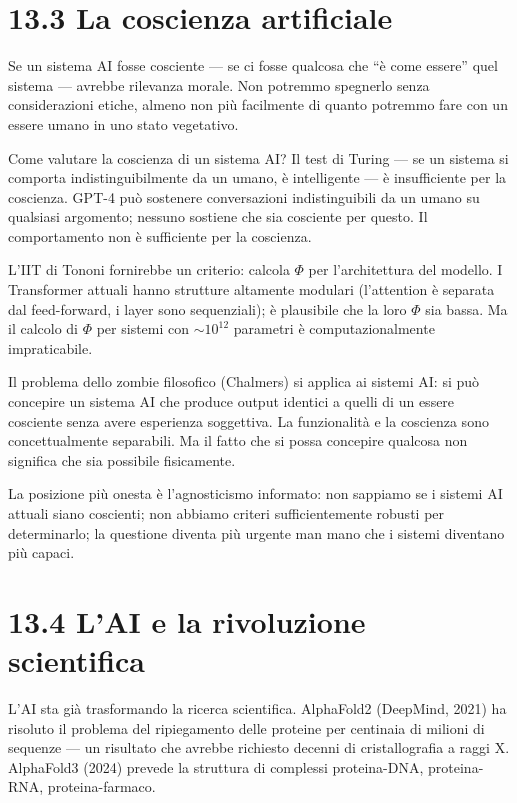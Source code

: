 \documentclass[11.5pt,a4paper,openany]{book}
\theoremstyle{remark}
\begin{document}
\section{13.3 La coscienza artificiale}

Se un sistema AI fosse cosciente --- se ci fosse qualcosa che ``è come essere'' quel sistema --- avrebbe rilevanza morale. Non potremmo spegnerlo senza considerazioni etiche, almeno non più facilmente di quanto potremmo fare con un essere umano in uno stato vegetativo.

Come valutare la coscienza di un sistema AI? Il test di Turing --- se un sistema si comporta indistinguibilmente da un umano, è intelligente --- è insufficiente per la coscienza. GPT-4 può sostenere conversazioni indistinguibili da un umano su qualsiasi argomento; nessuno sostiene che sia cosciente per questo. Il comportamento non è sufficiente per la coscienza.

L'IIT di Tononi fornirebbe un criterio: calcola $\Phi$ per l'architettura del modello. I Transformer attuali hanno strutture altamente modulari (l'attention è separata dal feed-forward, i layer sono sequenziali); è plausibile che la loro $\Phi$ sia bassa. Ma il calcolo di $\Phi$ per sistemi con $\sim 10^{12}$ parametri è computazionalmente impraticabile.

Il problema dello zombie filosofico (Chalmers) si applica ai sistemi AI: si può concepire un sistema AI che produce output identici a quelli di un essere cosciente senza avere esperienza soggettiva. La funzionalità e la coscienza sono concettualmente separabili. Ma il fatto che si possa concepire qualcosa non significa che sia possibile fisicamente.

La posizione più onesta è l'agnosticismo informato: non sappiamo se i sistemi AI attuali siano coscienti; non abbiamo criteri sufficientemente robusti per determinarlo; la questione diventa più urgente man mano che i sistemi diventano più capaci.

\section{13.4 L'AI e la rivoluzione scientifica}

L'AI sta già trasformando la ricerca scientifica. AlphaFold2 (DeepMind, 2021) ha risoluto il problema del ripiegamento delle proteine per centinaia di milioni di sequenze --- un risultato che avrebbe richiesto decenni di cristallografia a raggi X. AlphaFold3 (2024) prevede la struttura di complessi proteina-DNA, proteina-RNA, proteina-farmaco.
\end{document}
